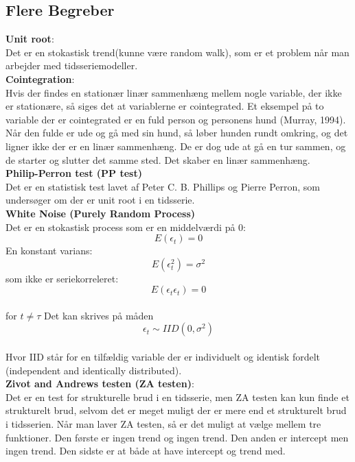 \documentclass[
  10pt,
]{article}
\begin{document}
\newpage

\hypertarget{flere-begreber}{%
\subsection{Flere Begreber}\label{flere-begreber}}

\textbf{Unit root}:\\
Det er en stokastisk trend(kunne være random walk), som er et problem
når man arbejder med tidsseriemodeller.\\

\textbf{Cointegration}:\\
Hvis der findes en stationær linær sammenhæng mellem nogle variable, der
ikke er stationære, så siges det at variablerne er cointegrated. Et
eksempel på to variable der er cointegrated er en fuld person og
personens hund (Murray, 1994). Når den fulde er ude og gå med sin hund,
så løber hunden rundt omkring, og det ligner ikke der er en linær
sammenhæng. De er dog ude at gå en tur sammen, og de starter og slutter
det samme sted. Det skaber en linær sammenhæng.\\

\textbf{Philip-Perron test (PP test)}\\
Det er en statistisk test lavet af Peter C. B. Phillips og Pierre
Perron, som undersøger om der er unit root i en tidsserie.\\

\textbf{White Noise (Purely Random Process)}\\
Det er en stokastisk process som er en middelværdi på 0:
\[E(\epsilon_t) = 0\] En konstant varians: \[E(\epsilon_t^2)=\sigma^2\]
som ikke er seriekorreleret: \[E(\epsilon_t\epsilon_t)=0\]\\
for \(t\neq\tau\) Det kan skrives på måden\\
\[\epsilon_t \sim IID(0,\sigma^2)\]\\
Hvor IID står for en tilfældig variable der er individuelt og identisk
fordelt (independent and identically distributed).\\

\textbf{Zivot and Andrews testen (ZA testen)}:\\
Det er en test for strukturelle brud i en tidsserie, men ZA testen kan
kun finde et strukturelt brud, selvom det er meget muligt der er mere
end et strukturelt brud i tidsserien. Når man laver ZA testen, så er det
muligt at vælge mellem tre funktioner. Den første er ingen trend og
ingen trend. Den anden er intercept men ingen trend. Den sidste er at
både at have intercept og trend med.
\end{document}
